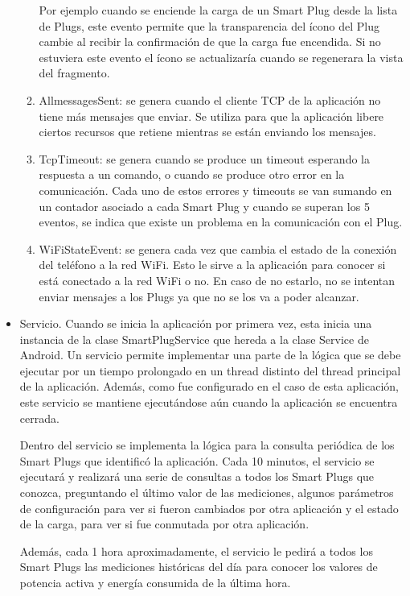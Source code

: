 \begin{itemize}
\begin{enumerate}
Por ejemplo cuando se enciende la carga de un Smart Plug desde la lista de Plugs, este evento permite que la transparencia del ícono del Plug cambie al recibir la confirmación de que la carga fue encendida. Si no estuviera este evento el ícono se actualizaría cuando se regenerara la vista del fragmento.
\item AllmessagesSent: se genera cuando el cliente TCP de la aplicación no tiene más mensajes que enviar. Se utiliza para que la aplicación libere ciertos recursos que retiene mientras se están enviando los mensajes.
\item TcpTimeout: se genera cuando se produce un timeout esperando la respuesta a un comando, o cuando se produce otro error en la comunicación. Cada uno de estos errores y timeouts se van sumando en un contador asociado a cada Smart Plug y cuando se superan los 5 eventos, se indica que existe un problema en la comunicación con el Plug.
\item WiFiStateEvent: se genera cada vez que cambia el estado de la conexión del teléfono a la red WiFi. Esto le sirve a la aplicación para conocer si está conectado a la red WiFi o no. En caso de no estarlo, no se intentan enviar mensajes a los Plugs ya que no se los va a poder alcanzar.
\end{enumerate}

\item Servicio. Cuando se inicia la aplicación por primera vez, esta inicia una instancia de la clase SmartPlugService que hereda a la clase Service de Android. Un servicio permite implementar una parte de la lógica que se debe ejecutar por un tiempo prolongado en un thread distinto del thread principal de la aplicación. Además, como fue configurado en el caso de esta aplicación, este servicio se mantiene ejecutándose aún cuando la aplicación se encuentra cerrada.

Dentro del servicio se implementa la lógica para la consulta periódica de los Smart Plugs que identificó la aplicación. Cada 10 minutos, el servicio se ejecutará y realizará una serie de consultas a todos los Smart Plugs que conozca, preguntando el último valor de las mediciones, algunos parámetros de configuración para ver si fueron cambiados por otra aplicación y el estado de la carga, para ver si fue conmutada por otra aplicación.

Además, cada 1 hora aproximadamente, el servicio le pedirá a todos los Smart Plugs las mediciones históricas del día para conocer los valores de potencia activa y energía consumida de la última hora.


\end{itemize}
